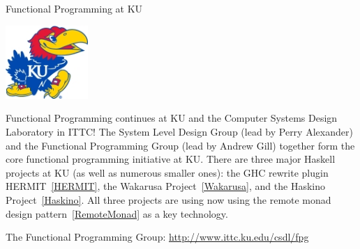 \begin{hcarentry}{Functional Programming at KU}
\label{ukansas}
\makeheader

\begin{center}
\includegraphics[width=0.235\textwidth]{html/jh2.jpg}
\end{center}

Functional Programming continues at KU and
the Computer Systems Design Laboratory in ITTC!
The System Level Design Group (lead by Perry Alexander)
and the Functional Programming Group (lead by Andrew Gill)
together form the core functional programming initiative at KU.
There are three major Haskell projects at KU (as
well as numerous smaller ones):
the GHC rewrite plugin HERMIT~\cref{HERMIT},
the Wakarusa Project~\cref{Wakarusa}, and
the Haskino Project~\cref{Haskino}.
All three projects 
are using now using the remote monad design pattern~\cref{RemoteMonad}
as a key technology.

\FurtherReading
\begin{compactitem}
\item   The Functional Programming Group:
    \url{http://www.ittc.ku.edu/csdl/fpg}
\end{compactitem}
\end{hcarentry}
